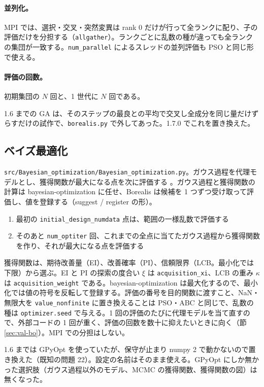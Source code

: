 \documentclass[11pt,a4paper,dvipdfmx]{jsarticle}
\begin{document}
\paragraph{並列化。} MPI では、選択・交叉・突然変異は rank 0 だけが行って全ランクに配り、子の評価だけを分担する（\texttt{allgather}）。ランクごとに乱数の種が違っても全ランクの集団が一致する。\texttt{num\_parallel} によるスレッドの並列評価も PSO と同じ形で使える。

\paragraph{評価の回数。} 初期集団の $N$ 回と、1 世代に $N$ 回である。

1.6 までの GA は、そのステップの最良との平均で交叉し全成分を同じ量だけずらすだけの試作で、\texttt{borealis.py} で外してあった。1.7.0 でこれを置き換えた。

\subsection{ベイズ最適化}\label{sec:bo}

\texttt{src/Bayesian\_optimization/Bayesian\_optimization.py}。ガウス過程を代理モデルとし、獲得関数が最大になる点を次に評価する \cite{jones1998}。ガウス過程と獲得関数の計算は bayesian-optimization \cite{bayesopt} に任せ、Borealis は候補を 1 つずつ受け取って評価し、値を登録する（suggest / register の形）。

\begin{enumerate}
\item 最初の \texttt{initial\_design\_numdata} 点は、範囲の一様乱数で評価する
\item そのあと \texttt{num\_optiter} 回、これまでの全点に当てたガウス過程から獲得関数を作り、それが最大になる点を評価する
\end{enumerate}

獲得関数は、期待改善量（EI）、改善確率（PI）、信頼限界（LCB。最小化では下限）から選ぶ。EI と PI の探索の度合い $\xi$ は \texttt{acquisition\_xi}、LCB の重み $\kappa$ は \texttt{acquisition\_weight} である。bayesian-optimization は最大化するので、最小化では値の符号を反転して登録する。評価の番号を目的関数に渡すこと、NaN・無限大を \texttt{value\_nonfinite} に置き換えることは PSO・ABC と同じで、乱数の種は \texttt{optimizer.seed} で与える。1 回の評価のたびに代理モデルを当て直すので、外部コードの 1 回が重く、評価の回数を数十に抑えたいときに向く（節 \ref{sec:val-bo}）。MPI での分担はしない。

1.6 までは GPyOpt \cite{gpyopt2016} を使っていたが、保守が止まり numpy 2 で動かないので置き換えた（既知の問題 22）。設定の名前はそのまま使える。GPyOpt にしか無かった選択肢（ガウス過程以外のモデル、MCMC の獲得関数、獲得関数の図）は無くなった。
\end{document}
